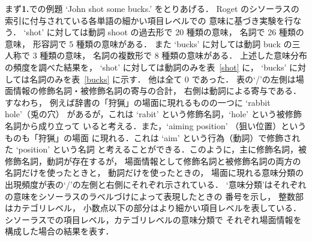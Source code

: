 まず{\bf 1.}での例題 `John shot some bucks.' をとりあげる．
Roget のシソーラスの索引に付与されている各単語の細かい項目レベルでの
意味に基づき実験を行なう．
`shot' に対しては動詞 shoot の過去形で 20 種類の意味，
名詞で 26 種類の意味，
形容詞で 5 種類の意味がある．
また `bucks' に対しては動詞 buck の三人称で 3 種類の意味，
名詞の複数形で 8 種類の意味がある．
上述した意味分布の頻度を調べた結果を，
`shot' に対しては動詞のみを表~\ref{shot} に，
`bucks' に対しては名詞のみを表~\ref{bucks} に示す．
他は全て 0 であった．
表の`/'の左側は場面情報の修飾名詞・被修飾名詞の寄与の合計，
右側は動詞による寄与である．
すなわち，
例えば辞書の「狩猟」の場面に現れるものの一つに `rabbit hole'（兎の穴）
があるが，これは `rabit' という修飾名詞，`hole' という被修飾名詞から成り立って
いると考える．また，`aiming position' （狙い位置）というものも「狩猟」の場面
に現れる．これは `aim' という行為（動詞）で修飾された `position' という名詞
と考えることができる．このように，主に修飾名詞，被修飾名詞，動詞が存在するが，
場面情報として修飾名詞と被修飾名詞の両方の名詞だけを使ったときと，
動詞だけを使ったときの，
場面に現れる意味分類の出現頻度が表の`/'の左側と右側にそれぞれ示されている．
`意味分類'はそれぞれの意味をシソーラスのラベルづけによって表現したときの
番号を示し，
整数部はカテゴリレベル，
小数点以下の部分はより細かい項目レベルを表している．
シソーラスでの項目レベル，カテゴリレベルの意味分類で
それぞれ場面情報を構成した場合の結果を表す．

